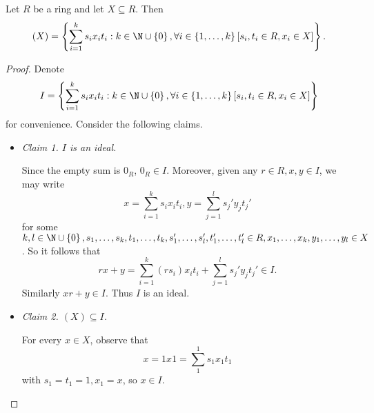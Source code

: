 \documentclass[pmath347]{subfiles}
\begin{document}
    \clearpage
    \begin{prop}{}
        Let $R$ be a ring and let $X\subseteq R$. Then
        \begin{equation*}
            \left( X \right) = \left\lbrace \sum^{k}_{i=1} s_ix_it_i: k\in\N\cup\left\lbrace 0 \right\rbrace , \forall i\in\left\lbrace 1,\ldots,k \right\rbrace \left[ s_i,t_i\in R, x_i\in X \right]  \right\rbrace .
        \end{equation*}
    \end{prop}

    \begin{proof}
        Denote
        \begin{equation*}
            I = \left\lbrace \sum^{k}_{i=1} s_ix_it_i: k\in\N\cup\left\lbrace 0 \right\rbrace , \forall i\in\left\lbrace 1,\ldots,k \right\rbrace \left[ s_i,t_i\in R, x_i\in X \right]  \right\rbrace
        \end{equation*}
        for convenience. Consider the following claims.
        \begin{itemize}
            \item \textit{Claim 1. $I$ is an ideal.}

                \begin{subproof}
                    Since the empty sum is $0_R$, $0_R\in I$. Moreover, given any $r\in R, x,y\in I$, we may write
                    \begin{equation*}
                        x = \sum^{k}_{i=1} s_ix_it_i, y = \sum^{l}_{j=1} s_j'y_jt_j' 
                    \end{equation*}
                    for some $k,l\in\N\cup\left\lbrace 0 \right\rbrace, s_1,\ldots,s_k,t_1,\ldots,t_k,s_1',\ldots,s_l',t_1',\ldots,t_l'\in R, x_1,\ldots,x_k,y_1,\ldots,y_l\in X$. So it follows that
                    \begin{equation*}
                        rx + y = \sum^{k}_{i=1} \left( rs_i \right) x_it_i + \sum^{l}_{j=1} s_j'y_jt_j' \in I.
                    \end{equation*}
                    Similarly $xr+y\in I$. Thus $I$ is an ideal. \qqqedsym
                \end{subproof}

            \item \textit{Claim 2. $\left( X \right) \subseteq I$.}

                \begin{subproof}
                    For every $x\in X$, observe that
                    \begin{equation*}
                        x = 1x1 = \sum^{1}_{1} s_1x_1t_1
                    \end{equation*}
                    with $s_1=t_1=1, x_1=x$, so $x\in I$. \qqqedsym
                \end{subproof}


\end{itemize}
\end{proof}
\end{document}

